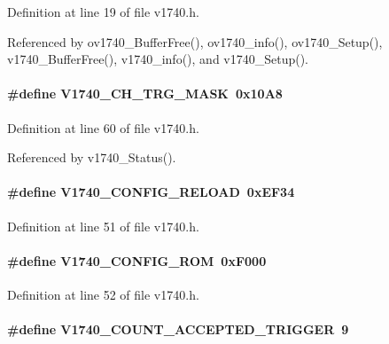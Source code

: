 Definition at line 19 of file v1740.h.

Referenced by ov1740\_\-BufferFree(), ov1740\_\-info(), ov1740\_\-Setup(), v1740\_\-BufferFree(), v1740\_\-info(), and v1740\_\-Setup().
\paragraph[{V1740\_\-CH\_\-TRG\_\-MASK}]{\setlength{\rightskip}{0pt plus 5cm}\#define V1740\_\-CH\_\-TRG\_\-MASK~0x10A8}\hfill\label{v1740_8h_a5b8283c7bc84de1180818ceef39bf485}


Definition at line 60 of file v1740.h.

Referenced by v1740\_\-Status().
\paragraph[{V1740\_\-CONFIG\_\-RELOAD}]{\setlength{\rightskip}{0pt plus 5cm}\#define V1740\_\-CONFIG\_\-RELOAD~0xEF34}\hfill\label{v1740_8h_a446fc5e06cfe13ee1ee14c3f1af6088a}


Definition at line 51 of file v1740.h.
\paragraph[{V1740\_\-CONFIG\_\-ROM}]{\setlength{\rightskip}{0pt plus 5cm}\#define V1740\_\-CONFIG\_\-ROM~0xF000}\hfill\label{v1740_8h_a18e231557c5da0e3e7279db7b629cee2}


Definition at line 52 of file v1740.h.
\paragraph[{V1740\_\-COUNT\_\-ACCEPTED\_\-TRIGGER}]{\setlength{\rightskip}{0pt plus 5cm}\#define V1740\_\-COUNT\_\-ACCEPTED\_\-TRIGGER~9}\hfill\label{v1740_8h_a069c2ce1dd3b8747d871807f4a1f061c}


